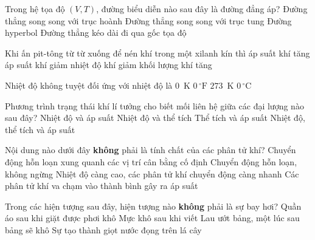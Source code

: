 	\begin{ex}%
		Trong hệ tọa độ $(V,T)$, đường biểu diễn nào sau đây là đường đẳng áp?
		\choice
		{Đường thẳng song song với trục hoành}
		{Đường thẳng song song với trục tung}
		{Đường hyperbol}
		{\True Đường thẳng kéo dài đi qua gốc tọa độ}
	\end{ex}

	\begin{ex}%
		Khi ấn pit-tông từ từ xuống để nén khí trong một xilanh kín thì
		\choice
		{\True áp suất khí tăng}
		{áp suất khí giảm}
		{nhiệt độ khí giảm}
		{khối lượng khí tăng}
	\end{ex}

	\begin{ex}%
		Nhiệt độ không tuyệt đối ứng với nhiệt độ là
		\choice
		{\True $0$~K}
		{$0\,^\circ\text{F}$}
		{$273$~K}
		{$0\,^\circ\text{C}$}
	\end{ex}

	\begin{ex}%
		Phương trình trạng thái khí lí tưởng cho biết mối liên hệ giữa các đại lượng nào sau đây?
		\choice
		{Nhiệt độ và áp suất}
		{Nhiệt độ và thể tích}
		{Thể tích và áp suất}
		{\True Nhiệt độ, thể tích và áp suất}
	\end{ex}

	\begin{ex}%
		Nội dung nào dưới đây \textbf{không} phải là tính chất của các phân tử khí?
		\choice
		{\True Chuyển động hỗn loạn xung quanh các vị trí cân bằng cố định}
		{Chuyển động hỗn loạn, không ngừng}
		{Nhiệt độ càng cao, các phân tử khí chuyển động càng nhanh}
		{Các phân tử khí va chạm vào thành bình gây ra áp suất}
	\end{ex}

	\begin{ex}%
		Trong các hiện tượng sau đây, hiện tượng nào \textbf{không} phải là sự bay hơi?
		\choice
		{Quần áo sau khi giặt được phơi khô}
		{Mực khô sau khi viết}
		{Lau ướt bảng, một lúc sau bảng sẽ khô}
		{\True Sự tạo thành giọt nước đọng trên lá cây}
	\end{ex}

